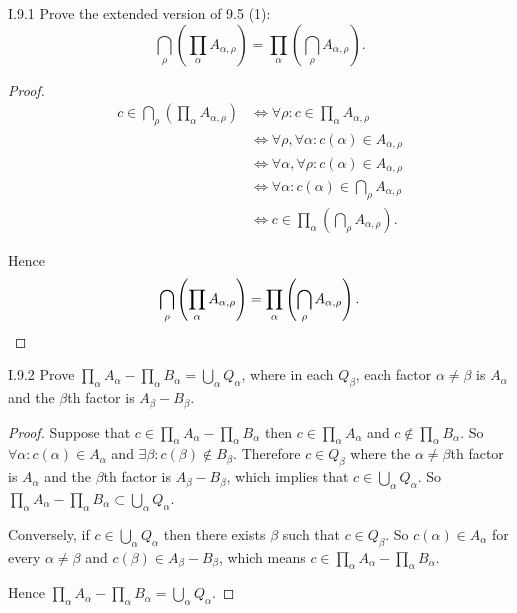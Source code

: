 \begin{problem}{I.9.1}
Prove the extended version of 9.5 (1):
\[
	\bigcap_{\rho}\left(\prod_{\alpha} A_{\alpha, \rho}\right) = \prod_{\alpha} \left(\bigcap_{\rho}A_{\alpha, \rho}\right).
\]
\end{problem}

\begin{proof}
	\begingroup
	\allowdisplaybreaks%
	\begin{align*}
		c \in \bigcap_{\rho}\left(\prod_{\alpha} A_{\alpha, \rho}\right) & \iff \forall \rho: c \in \prod_{\alpha} A_{\alpha, \rho}                \\
		                                                                 & \iff \forall \rho, \forall \alpha: c(\alpha) \in A_{\alpha, \rho}       \\
		                                                                 & \iff \forall \alpha, \forall \rho: c(\alpha) \in A_{\alpha, \rho}       \\
		                                                                 & \iff \forall \alpha: c(\alpha) \in \bigcap_{\rho}A_{\alpha, \rho}       \\
		                                                                 & \iff c \in \prod_{\alpha} \left(\bigcap_{\rho} A_{\alpha, \rho}\right).
	\end{align*}
	\endgroup

	Hence
	\[
		\bigcap_{\rho}\left(\prod_{\alpha} A_{\alpha, \rho}\right) = \prod_{\alpha} \left(\bigcap_{\rho}A_{\alpha, \rho}\right).\qedhere
	\]
\end{proof}

\begin{problem}{I.9.2}
Prove \( \prod_{\alpha} A_{\alpha} - \prod_{\alpha} B_{\alpha} = \bigcup_{\alpha} Q_{\alpha} \), where in each \( Q_{\beta} \), each factor \( \alpha\ne \beta \) is \( A_{\alpha} \) and the \( \beta \)th factor is \( A_{\beta} - B_{\beta} \).
\end{problem}

\begin{proof}
	Suppose that \( c \in \prod_{\alpha} A_{\alpha} - \prod_{\alpha} B_{\alpha} \) then \( c \in \prod_{\alpha} A_{\alpha} \) and \( c \notin \prod_{\alpha} B_{\alpha} \). So \( \forall \alpha: c(\alpha) \in A_{\alpha} \) and \( \exists \beta: c(\beta) \notin B_{\beta} \). Therefore \( c \in Q_{\beta} \) where the \( \alpha \ne \beta \)th factor is \( A_{\alpha} \) and the \( \beta \)th factor is \( A_{\beta} - B_{\beta} \), which implies that \( c \in \bigcup_{\alpha} Q_{\alpha} \). So \( \prod_{\alpha} A_{\alpha} - \prod_{\alpha} B_{\alpha} \subset \bigcup_{\alpha} Q_{\alpha} \).

	Conversely, if \( c \in \bigcup_{\alpha} Q_{\alpha} \) then there exists \( \beta \) such that \( c \in Q_{\beta} \). So \( c(\alpha) \in A_{\alpha} \) for every \( \alpha \ne \beta \) and \( c(\beta) \in A_{\beta} - B_{\beta} \), which means \( c \in \prod_{\alpha} A_{\alpha} - \prod_{\alpha} B_{\alpha} \).

	Hence \( \prod_{\alpha} A_{\alpha} - \prod_{\alpha} B_{\alpha} = \bigcup_{\alpha} Q_{\alpha} \).
\end{proof}

